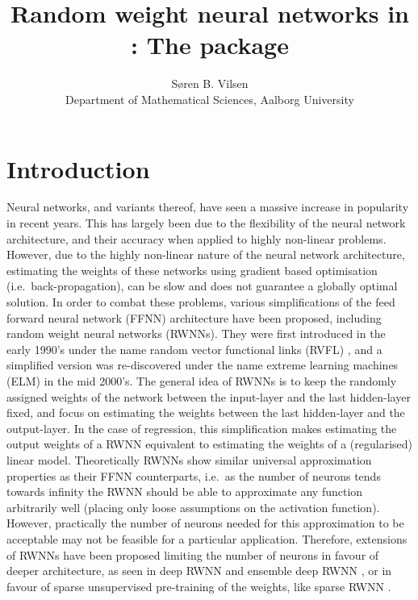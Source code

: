 \documentclass[
]{jss}
\author{
Søren B. Vilsen\\Department of Mathematical Sciences, Aalborg University
}
\title{Random weight neural networks in \proglang{R}: The \pkg{RWNN}
package}
\begin{document}
\hypertarget{introduction}{%
\section{Introduction}\label{introduction}}

Neural networks, and variants thereof, have seen a massive increase in
popularity in recent years. This has largely been due to the flexibility
of the neural network architecture, and their accuracy when applied to
highly non-linear problems. However, due to the highly non-linear nature
of the neural network architecture, estimating the weights of these
networks using gradient based optimisation (i.e.~back-propagation), can
be slow and does not guarantee a globally optimal solution. In order to
combat these problems, various simplifications of the feed forward
neural network (FFNN) architecture have been proposed, including random
weight neural networks (RWNNs). They were first introduced in the early
1990's under the name random vector functional links (RVFL)
\citep{Schmidt1992, Pao1994}, and a simplified version was re-discovered
under the name extreme learning machines (ELM) \citep{Huang2006} in the
mid 2000's. The general idea of RWNNs is to keep the randomly assigned
weights of the network between the input-layer and the last hidden-layer
fixed, and focus on estimating the weights between the last hidden-layer
and the output-layer. In the case of regression, this simplification
makes estimating the output weights of a RWNN equivalent to estimating
the weights of a (regularised) linear model. Theoretically RWNNs show
similar universal approximation properties as their FFNN counterparts,
i.e.~as the number of neurons tends towards infinity the RWNN should be
able to approximate any function arbitrarily well (placing only loose
assumptions on the activation function). However, practically the number
of neurons needed for this approximation to be acceptable may not be
feasible for a particular application. Therefore, extensions of RWNNs
have been proposed limiting the number of neurons in favour of deeper
architecture, as seen in deep RWNN \citep{Henriquez2018} and ensemble
deep RWNN \citep{Shi2021}, or in favour of sparse unsupervised
pre-training of the weights, like sparse RWNN \citep{Zhang2019}.
\end{document}
